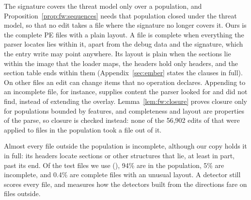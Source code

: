 The signature covers the threat model only over a population, and Proposition~\ref{prop:fw:sequences} needs that
population closed under the threat model, so that no edit takes a file where the signature no longer covers it. Ours
is the complete PE files with a plain layout. A file is complete when everything the parser locates lies within it,
apart from the debug data and the signature, which the entry write may point anywhere. Its layout is plain when the sections lie within the image that the loader maps, the headers hold only headers,
and the section table ends within them (Appendix~\ref{sec:ember} states the clauses in full). On other files an edit
can change items that no operation declares. Appending to an incomplete file, for instance, supplies content the
parser looked for and did not find, instead of extending the overlay. Lemma~\ref{lem:fw:closure} proves closure only for populations bounded by features, and completeness and layout
are properties of the parse, so closure is checked instead: none of the 56,902 edits of  that were applied to
files in the population took a file out of it.

Almost every file outside the population is incomplete, although our copy holds it in full: its headers locate sections or other structures that lie, at least in
part, past its end. Of the test files we use (), 94\% are in the population, 5\% are incomplete,
and 0.4\% are complete files with an unusual layout. A detector still scores every file, and
 measures how the detectors built from the directions fare on files outside.
